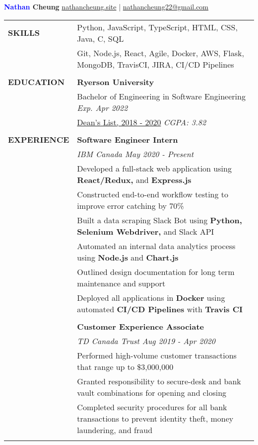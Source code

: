 \documentclass[letterpaper,11pt,oneside]{article}
\makeatletter
\newcommand\tabitem{\makebox[1em][r]{-~~}} %
\newcommand\tabspace{\makebox[1em][r]{~~~}} %
\newcommand{\header}{\noindent \huge{\textbf{\textcolor{blue}{Nathan} Cheung}} \hfill \normalsize{\href{https://nathancheung.site}{nathancheung.site} | \href{mailto:nathancheung22@gmail.com}{nathancheung22@gmail.com}} \\
\vspace{-2ex}
\hline 
\normalsize
\vspace{1.25em}}
\makeatother
\begin{document}
\header %


\noindent \begin{tabular}{@{}p{1.15in} p{6.08in}@{}}
 \textbf{SKILLS} 
     & Python, JavaScript, TypeScript, HTML, CSS, Java, C, SQL \\
     & Git, Node.js, React, Agile, Docker, AWS, Flask, MongoDB, TravisCI, JIRA, CI/CD Pipelines \\
     & \\

 \textbf{EDUCATION}
     & \textbf{Ryerson University} \\
     & Bachelor of Engineering in Software Engineering \hfill \textit{Exp. Apr 2022} \\
     & \href{https://www.ryerson.ca/content/dam/engineering-architectural-science/students/current-undergraduate/honours-recognition/pdfs/DeansList20182019September30.pdf}{Dean's List, 2018 - 2020} \hfill \textit{CGPA: 3.82} \\
     & \\

 \textbf{EXPERIENCE} 
     & \textbf{Software Engineer Intern} \\
     & \textit{IBM Canada \hfill May 2020 - Present} \\
     & \tabitem Developed a full-stack web application using \textbf{React/Redux,} and \textbf{Express.js} \\
     & \tabitem Constructed end-to-end workflow testing to improve error catching by 70\% \\
     & \tabitem Built a data scraping Slack Bot using \textbf{Python, Selenium Webdriver,} and Slack API \\
     & \tabitem Automated an internal data analytics process using \textbf{Node.js} and \textbf{Chart.js} \\
     & \tabitem Outlined design documentation for long term maintenance and support \\
     & \tabitem Deployed all applications in \textbf{Docker} using automated \textbf{CI/CD Pipelines} with \textbf{Travis CI} \\
     & \\
 
     & \textbf{Customer Experience Associate} \\
     & \textit{TD Canada Trust \hfill Aug 2019 - Apr 2020} \\
     & \tabitem Performed high-volume customer transactions that range up to \$3,000,000 \\ 
     & \tabitem Granted responsibility to secure-desk and bank vault combinations for opening and closing \\
     & \tabitem Completed security procedures for all bank transactions to prevent identity theft, money \tabspace laundering, and fraud \\
     & \\
     

\end{tabular}
\end{document}
